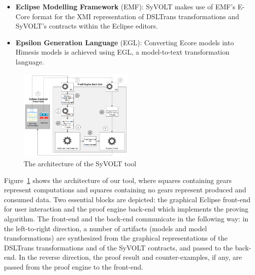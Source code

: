 \begin{itemize}
  \item \textbf{Eclipse Modelling Framework} (EMF): SyVOLT makes
  use of EMF's E-Core format for the XMI representation of DSLTrans transformations
  and SyVOLT's contracts within the Eclipse editors.
  \item \textbf{Epsilon Generation Language} (EGL): Converting
  Ecore models into Himesis models is achieved using EGL, a
  model-to-text transformation language.
\end{itemize}

\begin{figure}
\centering
\includegraphics[width=0.5\textwidth]{figures/tooling_arch}
\caption{The architecture of the SyVOLT tool}
\label{fig:arch}
\vspace{-.5cm}
\end{figure}



Figure~\ref{fig:arch} shows the architecture of our tool, where
squares containing gears represent computations and squares
containing no gears represent produced and consumed data.
Two essential blocks are depicted: the graphical Eclipse front-end for user
interaction and the proof engine back-end which implements the proving algorithm. The front-end and the back-end communicate in the following way:
in the left-to-right direction, a number of artifacts (models and model
transformations) are synthesized from the graphical representations of the
DSLTrans transformations and of the SyVOLT contracts, and passed to the
back-end. In the reverse direction, the proof result and counter-examples, if
any, are passed from the proof engine to the front-end.

